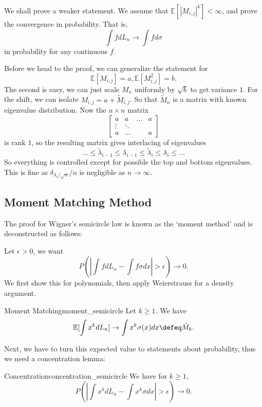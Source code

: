 We shall prove a weaker statement. We assume that $\mathbb{E}[|M_{i,j}|^k]<\infty$, and prove the convergence in probability. That is,\[
\int f dL_n \to \int f d\sigma
\]
in probability for any continuous $f$.

Before we head to the proof, we can generalize the statement for \[
\mathbb{E}[M_{i,j}]=a, \mathbb{E}[M_{i,j}^2]=b.
\]
The second is easy, we can just scale $M_n$ uniformly by $\sqrt{b}$ to get variance $1$. For the shift, we can isolate $M_{i,j}=a+\tilde{M}_{i,j}$. So that $\tilde{M}_n$ is a matrix with known eigenvalue distribution. Now the $n\times n$ matrix\[
    \begin{bmatrix}
        a & a& ...& a\\
        \vdots& \ddots \\
        a & ... &&a
    \end{bmatrix}
\]
is rank $1$, so the resulting matrix gives interlacing of eigenvalues \[
...\leq \tilde{\lambda}_{i-1} \leq \lambda_{i-1} \leq \tilde{\lambda}_i \leq\lambda_i \leq ...
\]
So everything is controlled except for possible the top and bottom eigenvalues. This is fine as $\delta_{\lambda_i/\sqrt{n}}/n$ is negligible as $n\to \infty$.

\subsection*{Moment Matching Method}

The proof for Wigner's semicircle law is known as the `moment method' and is deconstructed as follows:

Let $\epsilon > 0 $, we want \[
P(|\int f d L_n - \int f  \sigma dx| > \epsilon )\to 0.
\]
We first show this for polynomials, then apply Weierstrauss for a density argument.
\begin{alemma}{Moment Matching}{moment_semicircle}
    Let $k\geq 1$. We have \[
    \mathbb{E}[\int x^k dL_n ]\to \int x^k \sigma(x) dx \defeq \tilde{M}_k.
    \]
\end{alemma}
Next, we have to turn this expected value to statements about probability, thus we need a concentration lemma: 

\begin{alemma}{Concentration}{concentration_semicircle}
    We have for $k\geq 1$, \[
    P(|\int x^k dL_n -\int x^k \sigma dx|>\epsilon )\to 0.
    \]
\end{alemma}

